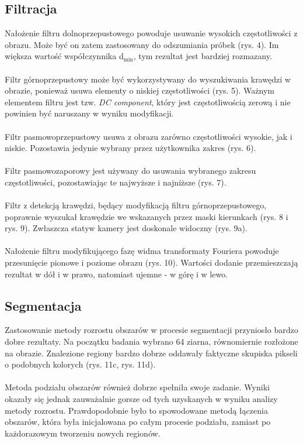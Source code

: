 \documentclass{classrep}
\begin{document}
\subsection{Filtracja}
Nałożenie filtru dolnoprzepustowego powoduje usuwanie wysokich częstotliwości z obrazu. Może być on zatem zastosowany do odszumiania próbek (rys. 4). Im większa wartość współczynnika d$_{\text{min}}$, tym rezultat jest bardziej rozmazany.\\
\\
\indent
Filtr górnoprzepustowy może być wykorzystywany do wyszukiwania krawędzi w obrazie, ponieważ usuwa elementy o niskiej częstotliwości (rys. 5). Ważnym elementem filtru jest tzw. \textit{DC component}, który jest częstotliwością zerową i nie powinien być naruszany w wyniku modyfikacji.\\
\\
\indent
Filtr pasmowoprzepustowy usuwa z obrazu zarówno częstotliwości wysokie, jak i niskie. Pozostawia jedynie wybrany przez użytkownika zakres (rys. 6).\\
\\
\indent
Filtr pasmowozaporowy jest używany do usuwania wybranego zakresu częstotliwości, pozostawiając te najwyższe i najniższe (rys. 7).\\
\\
\indent
Filtr z detekcją krawędzi, będący modyfikacją filtru górnoprzepustowego, poprawnie wyszukał krawędzie we wskazanych przez maski kierunkach (rys. 8 i rys. 9). Zwłaszcza statyw kamery jest doskonale widoczny (rys. 9a).\\
\\
\indent
Nałożenie filtru modyfikującego fazę widma transformaty Fouriera powoduje przesunięcie pionowe i poziome obrazu (rys. 10). Wartości dodanie przemieszczają rezultat w dół i w prawo, natomiast ujemne - w górę i w lewo.\\

\subsection{Segmentacja}
Zastosowanie metody rozrostu obszarów w procesie segmentacji przyniosło bardzo dobre rezultaty. Na początku badania wybrano 64 ziarna, równomiernie rozłożone na obrazie. Znalezione regiony bardzo dobrze oddawały faktyczne skupiska pikseli o podobnych kolorych (rys. 11c, rys. 11d).\\
\\
\indent
Metoda podziału obszarów również dobrze spełniła swoje zadanie. Wyniki okazały się jednak zauważalnie gorsze od tych uzyskanych w wyniku analizy metody rozrostu. Prawdopodobnie było to spowodowane metodą łączenia obszarów, która była inicjalowana po całym procesie podziału, zamiast po każdorazowym tworzeniu nowych regionów. 
\end{document}
